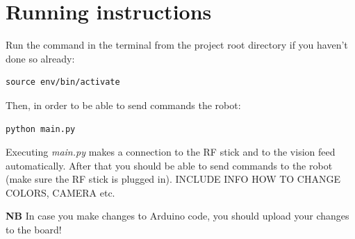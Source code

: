 \documentclass[12pt]{article}
\begin{document}
\section{Running instructions}

Run the command in the terminal from the project root directory if you haven't done so already:
\begin{lstlisting}
source env/bin/activate
\end{lstlisting}
Then, in order to be able to send commands the robot:
\begin{lstlisting}
python main.py
\end{lstlisting}
Executing \textit{main.py} makes a connection to the RF stick and to the vision feed automatically. After that you should be able to send commands to the robot (make sure the RF stick is plugged in).
\bigskip
INCLUDE INFO HOW TO CHANGE COLORS, CAMERA etc.
\bigskip

\textbf{NB} In case you make changes to Arduino code, you should upload your changes to the board!
\bigskip
\end{document}
